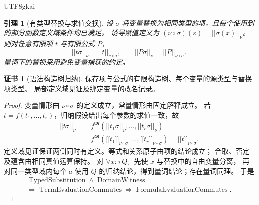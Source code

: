 \documentclass[12pt,a4paper,openany,notitlepage]{report}
\theoremstyle{plain}
\newtheorem{lemma}[theorem]{引理}
\theoremstyle{definition}
\newtheorem*{certificate}{证书}
\theoremstyle{remark}
\begin{document}
\begin{CJK*}{UTF8}{gkai}
\begin{lemma}[有类型替换与求值交换]
\label{exp:logic:substitution}
设 $\sigma$ 将变量替换为相同类型的项，且每个使用到的部分函数定义域条件均已满足。
诱导赋值定义为
$(\nu\circ\sigma)(x)=\lbrack\!\lbrack\sigma(x)\rbrack\!\rbrack_\nu$。
则对任意有限项 $t$ 与有限公式 $P$，
\[
 \lbrack\!\lbrack t\sigma\rbrack\!\rbrack_\nu
 =\lbrack\!\lbrack t\rbrack\!\rbrack_{\nu\circ\sigma},\qquad
 \lbrack\!\lbrack P\sigma\rbrack\!\rbrack_\nu
 =\lbrack\!\lbrack P\rbrack\!\rbrack_{\nu\circ\sigma}.
\]
量词下的替换采用避免变量捕获的约定。
\end{lemma}
\begin{certificate}[语法构造树归纳]
保存项与公式的有限构造树、每个变量的源类型与替换项类型、
局部定义域见证及绑定变量的改名记录。
\end{certificate}
\begin{proof}
变量情形由 $\nu\circ\sigma$ 的定义成立，常量情形由固定解释成立。
若 $t=f(t_1,\ldots,t_r)$，归纳假设给出每个参数的求值一致，故
\[
 \begin{aligned}
 \lbrack\!\lbrack t\sigma\rbrack\!\rbrack_\nu
 &=f^{\mathfrak M}(\lbrack\!\lbrack t_1\sigma\rbrack\!\rbrack_\nu,
                    \ldots,\lbrack\!\lbrack t_r\sigma\rbrack\!\rbrack_\nu)\\
 &=f^{\mathfrak M}(\lbrack\!\lbrack t_1\rbrack\!\rbrack_{\nu\circ\sigma},
                    \ldots,\lbrack\!\lbrack t_r\rbrack\!\rbrack_{\nu\circ\sigma})
 =\lbrack\!\lbrack t\rbrack\!\rbrack_{\nu\circ\sigma}.
 \end{aligned}
\]
定义域见证保证两侧同时有定义。等式和关系原子由项的结论成立；
合取、否定及蕴含由相同真值运算保持。
对 $\forall x:\tau\,Q$，先使 $x$ 与替换中的自由变量分离，
再对同一类型域内每个 $a$ 使用 $Q$ 的归纳结论，得到量词结论；存在量词同理。
于是
\[
 \begin{gathered}
 \operatorname{TypedSubstitution}\land\operatorname{DomainWitness}\\
 \Rightarrow\operatorname{TermEvaluationCommutes}
 \Rightarrow\operatorname{FormulaEvaluationCommutes}.
 \end{gathered}
\]
\end{proof}


\end{CJK*}
\end{document}
